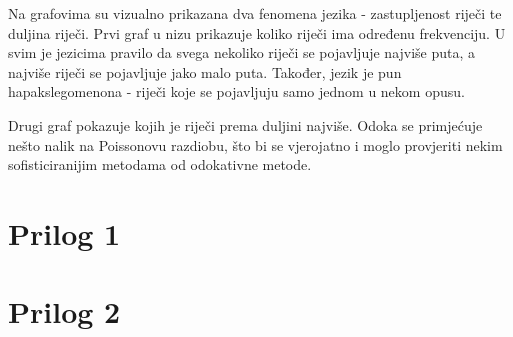 \documentclass{foi}
\begin{document}
Na grafovima su vizualno prikazana dva fenomena jezika - zastupljenost riječi
te duljina riječi. Prvi graf u nizu prikazuje koliko riječi ima određenu
frekvenciju. U svim je jezicima pravilo da svega nekoliko riječi se pojavljuje
najviše puta, a najviše riječi se pojavljuje jako malo puta. Također, jezik je
pun hapakslegomenona - riječi koje se pojavljuju samo jednom u nekom opusu.

Drugi graf pokazuje kojih je riječi prema duljini najviše. Odoka se primjećuje
nešto nalik na Poissonovu razdiobu, što bi se vjerojatno i moglo provjeriti
nekim sofisticiranijim metodama od odokativne metode.

\pagestyle{plain}


\listoffigures
{}

\listoftables
{}

\appendix
\renewcommand{\thechapter}{\arabic{chapter}}

\chapter{Prilog 1}

\chapter{Prilog 2}
\end{document}
